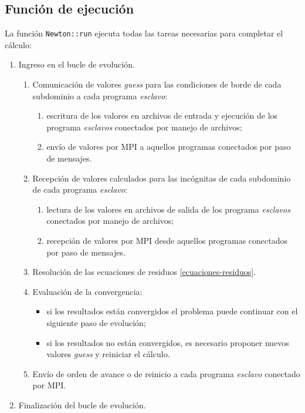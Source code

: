 \subsection*{Función de ejecución}
\label{ap2:newton-run}

La función \texttt{Newton::run} ejecuta todas las tareas necesarias para completar el cálculo:
\begin{enumerate}
\item Ingreso en el bucle de evolución.
  \begin{enumerate}
  \item Comunicación de valores \textit{guess} para las condiciones de borde de cada subdominio a cada programa \textit{esclavo}:
    \begin{enumerate}
    \item escritura de los valores en archivos de entrada y ejecución de los programa \textit{esclavos} conectados por manejo de archivos;
    \item envío de valores por MPI a aquellos programas conectados por paso de mensajes.
    \end{enumerate}
  \item Recepción de valores calculados para las incógnitas de cada subdominio de cada programa \textit{esclavo}:
    \begin{enumerate}
    \item lectura de los valores en archivos de salida de los programa \textit{esclavos} conectados por manejo de archivos;
    \item recepción de valores por MPI desde aquellos programas conectados por paso de mensajes.
    \end{enumerate}
  \item Resolución de las ecuaciones de residuos \ref{ecuaciones-residuos}.
  \item Evaluación de la convergencia:
  \begin{itemize}
  \item si los resultados están convergidos el problema puede continuar con el siguiente paso de evolución;
  \item si los resultados no están convergidos, es necesario proponer nuevos valores \textit{guess} y reiniciar el cálculo.
  \end{itemize}
  \item Envío de orden de avance o de reinicio a cada programa \textit{esclavo} conectado por MPI.
  \end{enumerate}
\item Finalización del bucle de evolución.
\end{enumerate}

